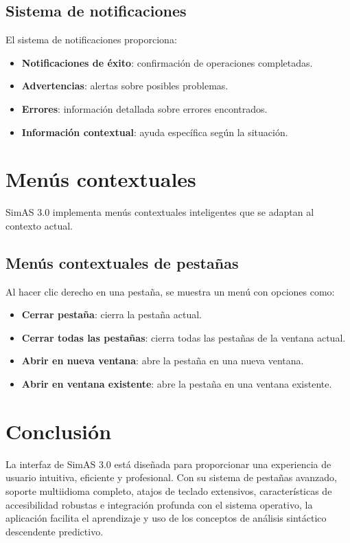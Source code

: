 \subsection{Sistema de notificaciones}

El sistema de notificaciones proporciona:

\begin{itemize}
    \item \textbf{Notificaciones de éxito}: confirmación de operaciones completadas.
    \item \textbf{Advertencias}: alertas sobre posibles problemas.
    \item \textbf{Errores}: información detallada sobre errores encontrados.
    \item \textbf{Información contextual}: ayuda específica según la situación.
\end{itemize}

\section{Menús contextuales}

SimAS 3.0 implementa menús contextuales inteligentes que se adaptan al contexto actual.

\subsection{Menús contextuales de pestañas}

Al hacer clic derecho en una pestaña, se muestra un menú con opciones como:

\begin{itemize}
    \item \textbf{Cerrar pestaña}: cierra la pestaña actual.
    \item \textbf{Cerrar todas las pestañas}: cierra todas las pestañas de la ventana actual.
    \item \textbf{Abrir en nueva ventana}: abre la pestaña en una nueva ventana.
    \item \textbf{Abrir en ventana existente}: abre la pestaña en una ventana existente.
\end{itemize}


\section{Conclusión}

La interfaz de SimAS 3.0 está diseñada para proporcionar una experiencia de usuario intuitiva, eficiente y profesional. Con su sistema de pestañas avanzado, soporte multiidioma completo, atajos de teclado extensivos, características de accesibilidad robustas e integración profunda con el sistema operativo, la aplicación facilita el aprendizaje y uso de los conceptos de análisis sintáctico descendente predictivo.

